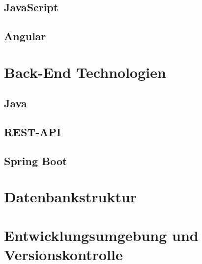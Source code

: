 \subsection{JavaScript}

\subsection{Angular}

\section{Back-End Technologien}

\subsection{Java}

\subsection{REST-API}

\subsection{Spring Boot}

\section{Datenbankstruktur}

\section{Entwicklungsumgebung und Versionskontrolle}


